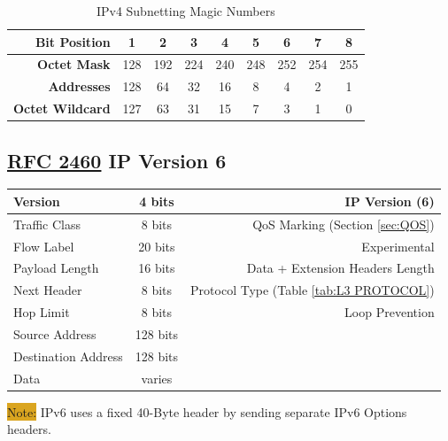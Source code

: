 \documentclass[12pt]{article}
\newcommand{\note}[1]{\colorbox{#1}{Note:}}
\newcommand{\RFC}[1]{\href{https://datatracker.ietf.org/doc/html/rfc#1}{RFC #1}}
\begin{document}
	\begin{table}[H]
	\centering
	\caption{IPv4 Subnetting Magic Numbers \label{tab:SUBNETTING}}
	\begin{tabular}{r | cccccccc}
	\hline
	\textbf{Bit Position}	& 1	& 2	& 3	& 4	& 5	& 6	& 7 & 8\\\hline
	\textbf{Octet Mask}	& 128 & 192 & 224 & 240 & 248 & 252 & 254 & 255\\\hline
	\textbf{Addresses}	& 128	& 64	& 32	& 16	& 8	& 4	& 2	& 1\\\hline
	\textbf{Octet Wildcard}	& 127	& 63	& 31 	& 15	& 7	& 3	& 1	& 0\\\hline
	\end{tabular}\end{table}


	\subsection{\RFC{2460} IP Version 6 \label{subsec:IPV6}}
	\begin{table}[H]
	\centering
	\begin{tabular}{| l | c | r |}
	\hline
	Version			& 4 bits	& IP Version (6)\\\hline
	Traffic Class			& 8 bits	& QoS Marking (Section \ref{sec:QOS})\\\hline
	Flow Label			& 20 bits	& Experimental\\\hline
	Payload Length		& 16 bits	& Data + Extension Headers Length\\\hline
	Next Header		& 8 bits	& Protocol Type (Table \ref{tab:L3 PROTOCOL})\\\hline
	Hop Limit			& 8 bits	& Loop Prevention\\\hline
	Source Address		& 128 bits	&\\\hline
	Destination Address	& 128 bits	&\\\hline
	Data				& varies	&\\\hline
	\end{tabular}\end{table}
	\note{Goldenrod} IPv6 uses a fixed 40-Byte header by sending separate IPv6 Options headers.
\end{document}
